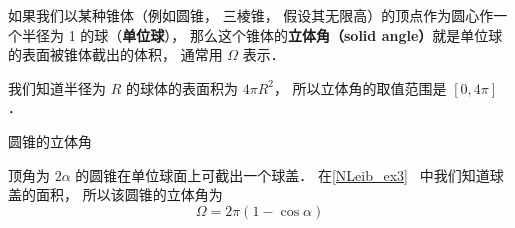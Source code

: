 
如果我们以某种锥体（例如圆锥， 三棱锥， 假设其无限高）的顶点作为圆心作一个半径为 1 的球（\textbf{单位球}）， 那么这个锥体的\textbf{立体角（solid angle）}就是单位球的表面被锥体截出的体积， 通常用 $\Omega$ 表示．

我们知道半径为 $R$ 的球体的表面积为 $4\pi R^2$， 所以立体角的取值范围是 $[0, 4\pi]$．

\begin{example}{圆锥的立体角}

顶角为 $2\alpha$ 的圆锥在单位球面上可截出一个球盖． 在\autoref{NLeib_ex3}~ 中我们知道球盖的面积， 所以该圆锥的立体角为
\begin{equation}
\Omega = 2\pi (1 - \cos\alpha)
\end{equation}
\end{example}
